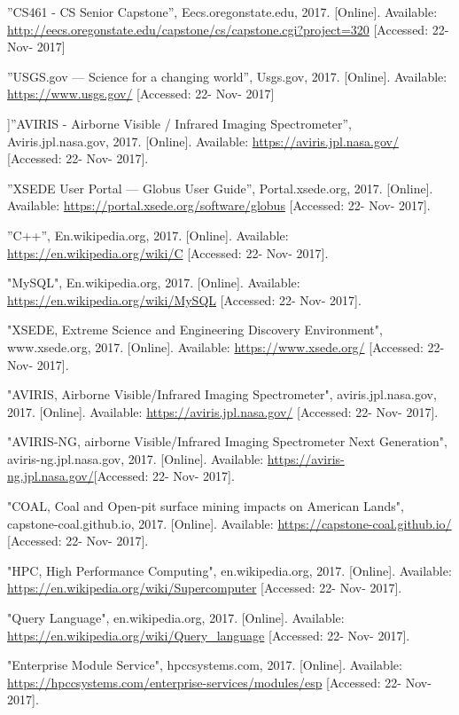 \documentclass[onecolumn, draftclsnofoot,10pt, compsoc]{IEEEtran}
\begin{document}
\begin{thebibliography}{9}
 ”CS461 - CS Senior Capstone”, Eecs.oregonstate.edu, 2017. [Online]. Available: \url{http://eecs.oregonstate.edu/capstone/cs/capstone.cgi?project=320} [Accessed: 22- Nov- 2017]

 ”USGS.gov — Science for a changing world”, Usgs.gov, 2017. [Online]. Available: \url{https://www.usgs.gov/} [Accessed: 22- Nov- 2017]

 ]”AVIRIS - Airborne Visible / Infrared Imaging Spectrometer”, Aviris.jpl.nasa.gov, 2017. [Online]. Available:
\url{https://aviris.jpl.nasa.gov/} [Accessed: 22- Nov- 2017].

 ”XSEDE User Portal — Globus User Guide”, Portal.xsede.org, 2017. [Online]. Available: \url{https://portal.xsede.org/software/globus} [Accessed: 22- Nov- 2017].

 ”C++”, En.wikipedia.org, 2017. [Online]. Available:
\url{https://en.wikipedia.org/wiki/C} [Accessed: 22- Nov- 2017].

 "MySQL", En.wikipedia.org, 2017. [Online]. Available: \url{https://en.wikipedia.org/wiki/MySQL} [Accessed: 22- Nov- 2017].

 "XSEDE, Extreme Science and Engineering Discovery Environment", www.xsede.org, 2017. [Online]. Available: \url{https://www.xsede.org/} [Accessed: 22- Nov- 2017].

 "AVIRIS, Airborne Visible/Infrared Imaging Spectrometer", aviris.jpl.nasa.gov, 2017. [Online]. Available: \url{https://aviris.jpl.nasa.gov/} [Accessed: 22- Nov- 2017].

 "AVIRIS-NG, airborne Visible/Infrared Imaging Spectrometer Next Generation", aviris-ng.jpl.nasa.gov, 2017. [Online]. Available: \url{https://aviris-ng.jpl.nasa.gov/}[Accessed: 22- Nov- 2017].

 "COAL, Coal and Open-pit surface mining impacts on American Lands", capstone-coal.github.io, 2017. [Online]. Available: \url{https://capstone-coal.github.io/} [Accessed: 22- Nov- 2017].

 "HPC, High Performance Computing", en.wikipedia.org, 2017. [Online]. Available: \url{https://en.wikipedia.org/wiki/Supercomputer} [Accessed: 22- Nov- 2017].

 "Query Language", en.wikipedia.org, 2017. [Online]. Available: \url{https://en.wikipedia.org/wiki/Query_language} [Accessed: 22- Nov- 2017].

 "Enterprise Module Service", hpccsystems.com, 2017. [Online]. Available: \url{https://hpccsystems.com/enterprise-services/modules/esp} [Accessed: 22- Nov- 2017].


\end{thebibliography}
\end{document}

